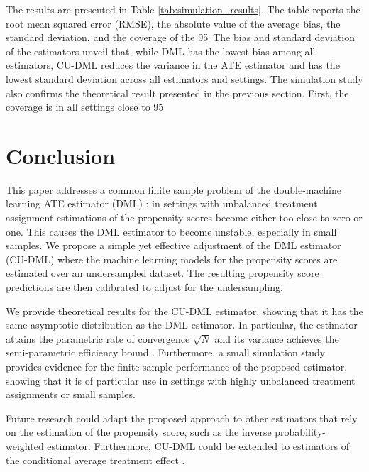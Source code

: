 The results are presented in Table \ref{tab:simulation_results}. The table reports the root mean squared error (RMSE), the absolute value of the average bias, the standard deviation, and the coverage of the 95\
The bias and standard deviation of the estimators unveil that, while DML has the lowest bias among all estimators, CU-DML reduces the variance in the ATE estimator and has the lowest standard deviation across all estimators and settings. The simulation study also confirms the theoretical result presented in the previous section. First, the coverage is in all settings close to 95\

\section{Conclusion}
This paper addresses a common finite sample problem of the double-machine learning ATE estimator (DML) \citep{Chernozhukov2018}: in settings with unbalanced treatment assignment estimations of the propensity scores become either too close to zero or one. This causes the DML estimator to become unstable, especially in small samples. We propose a simple yet effective adjustment of the DML estimator (CU-DML) where the machine learning models for the propensity scores are estimated over an undersampled dataset. The resulting propensity score predictions are then calibrated to adjust for the undersampling. 

We provide theoretical results for the CU-DML estimator, showing that it has the same asymptotic distribution as the DML estimator. In particular, the estimator attains the parametric rate of convergence $\sqrt{N}$ and its variance achieves the semi-parametric efficiency bound \citep{Hahn1998}. Furthermore, a small simulation study provides evidence for the finite sample performance of the proposed estimator, showing that it is of particular use in settings with highly unbalanced treatment assignments or small samples.

Future research could adapt the proposed approach to other estimators that rely on the estimation of the propensity score, such as the inverse probability-weighted estimator. Furthermore, CU-DML could be extended to estimators of the conditional average treatment effect \citep{Fan2022,Zimmert2019}.





